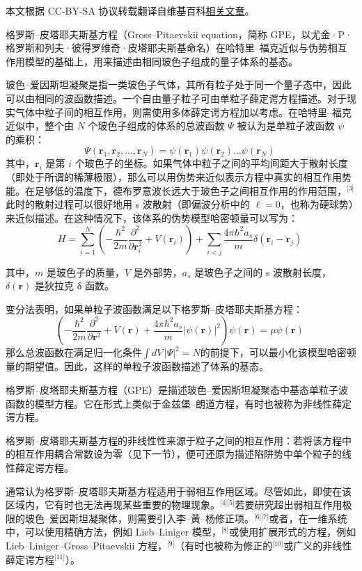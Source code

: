 
本文根据 CC-BY-SA 协议转载翻译自维基百科\href{https://en.wikipedia.org/wiki/Gross\%E2\%80\%93Pitaevskii_equation}{相关文章}。

格罗斯–皮塔耶夫斯基方程（Gross–Pitaevskii equation，简称 GPE，以尤金·P·格罗斯和列夫·彼得罗维奇·皮塔耶夫斯基命名）在哈特里–福克近似与伪势相互作用模型的基础上，用来描述由相同玻色子组成的量子体系的基态。

玻色–爱因斯坦凝聚是指一类玻色子气体，其所有粒子处于同一个量子态中，因此可以由相同的波函数描述。一个自由量子粒子可由单粒子薛定谔方程描述。对于现实气体中粒子间的相互作用，则需使用多体薛定谔方程加以考虑。在哈特里–福克近似中，整个由 $N$ 个玻色子组成的体系的总波函数 $\Psi$ 被认为是单粒子波函数 $\psi$ 的乘积：
$$
\Psi(\mathbf{r}_1, \mathbf{r}_2, \dots, \mathbf{r}_N) = \psi(\mathbf{r}_1)\psi(\mathbf{r}_2) \dots \psi(\mathbf{r}_N)~
$$
其中，$\mathbf{r}_i$ 是第 $i$ 个玻色子的坐标。如果气体中粒子之间的平均间距大于散射长度（即处于所谓的稀薄极限），那么可以用伪势来近似表示方程中真实的相互作用势能。在足够低的温度下，德布罗意波长远大于玻色子之间相互作用的作用范围，\(^\text{[3]}\)此时的散射过程可以很好地用 s 波散射（即偏波分析中的 $\ell = 0$，也称为硬球势）来近似描述。在这种情况下，该体系的伪势模型哈密顿量可以写为：
$$
H = \sum_{i=1}^{N} \left( -\frac{\hbar^2}{2m} \frac{\partial^2}{\partial \mathbf{r}_i^2} + V(\mathbf{r}_i) \right) + \sum_{i<j} \frac{4\pi \hbar^2 a_s}{m} \delta(\mathbf{r}_i - \mathbf{r}_j)~
$$

其中，$m$ 是玻色子的质量，$V$ 是外部势，$a_s$ 是玻色子之间的 s 波散射长度，$\delta(\mathbf{r})$ 是狄拉克 δ 函数。

变分法表明，如果单粒子波函数满足以下格罗斯–皮塔耶夫斯基方程：
$$
\left(-\frac{\hbar^2}{2m} \frac{\partial^2}{\partial \mathbf{r}^2} + V(\mathbf{r}) + \frac{4\pi \hbar^2 a_s}{m} |\psi(\mathbf{r})|^2 \right) \psi(\mathbf{r}) = \mu \psi(\mathbf{r})~
$$
那么总波函数在满足归一化条件$\int dV\,|\Psi|^2 = N$的前提下，可以最小化该模型哈密顿量的期望值。因此，这样的单粒子波函数描述了体系的基态。

格罗斯–皮塔耶夫斯基方程（GPE）是描述玻色–爱因斯坦凝聚态中基态单粒子波函数的模型方程。它在形式上类似于金兹堡–朗道方程，有时也被称为非线性薛定谔方程。

格罗斯–皮塔耶夫斯基方程的非线性性来源于粒子之间的相互作用：若将该方程中的相互作用耦合常数设为零（见下一节），便可还原为描述陷阱势中单个粒子的线性薛定谔方程。

通常认为格罗斯–皮塔耶夫斯基方程适用于弱相互作用区域。尽管如此，即使在该区域内，它有时也无法再现某些重要的物理现象。\(^\text{[4][5]}\)若要研究超出弱相互作用极限的玻色–爱因斯坦凝聚体，则需要引入李–黄–杨修正项。\(^\text{[6][7]}\)或者，在一维系统中，可以使用精确方法，例如 Lieb–Liniger 模型，\(^\text{[8]}\)或使用扩展形式的方程，例如 Lieb–Liniger–Gross–Pitaevskii 方程，\(^\text{[9]}\)（有时也被称为修正的\(^\text{[10]}\)或广义的非线性薛定谔方程\(^\text{[11]}\)）。
